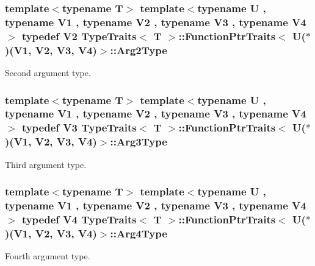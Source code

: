 \subsubsection[{\texorpdfstring{Arg2\+Type}{Arg2Type}}]{\setlength{\rightskip}{0pt plus 5cm}template$<$typename T$>$ template$<$typename U , typename V1 , typename V2 , typename V3 , typename V4 $>$ typedef V2 {\bf Type\+Traits}$<$ T $>$\+::{\bf Function\+Ptr\+Traits}$<$ U($\ast$)(V1, V2, V3, V4)$>$\+::{\bf Arg2\+Type}}\hypertarget{structTypeTraits_1_1FunctionPtrTraits_3_01U_07_5_08_07V1_00_01V2_00_01V3_00_01V4_08_4_a27f72dbf8afca02467b67af4f3ca1adc}{}\label{structTypeTraits_1_1FunctionPtrTraits_3_01U_07_5_08_07V1_00_01V2_00_01V3_00_01V4_08_4_a27f72dbf8afca02467b67af4f3ca1adc}
Second argument type. 
\subsubsection[{\texorpdfstring{Arg3\+Type}{Arg3Type}}]{\setlength{\rightskip}{0pt plus 5cm}template$<$typename T$>$ template$<$typename U , typename V1 , typename V2 , typename V3 , typename V4 $>$ typedef V3 {\bf Type\+Traits}$<$ T $>$\+::{\bf Function\+Ptr\+Traits}$<$ U($\ast$)(V1, V2, V3, V4)$>$\+::{\bf Arg3\+Type}}\hypertarget{structTypeTraits_1_1FunctionPtrTraits_3_01U_07_5_08_07V1_00_01V2_00_01V3_00_01V4_08_4_a317f0d2787af766d28a82c50047f2204}{}\label{structTypeTraits_1_1FunctionPtrTraits_3_01U_07_5_08_07V1_00_01V2_00_01V3_00_01V4_08_4_a317f0d2787af766d28a82c50047f2204}
Third argument type. 
\subsubsection[{\texorpdfstring{Arg4\+Type}{Arg4Type}}]{\setlength{\rightskip}{0pt plus 5cm}template$<$typename T$>$ template$<$typename U , typename V1 , typename V2 , typename V3 , typename V4 $>$ typedef V4 {\bf Type\+Traits}$<$ T $>$\+::{\bf Function\+Ptr\+Traits}$<$ U($\ast$)(V1, V2, V3, V4)$>$\+::{\bf Arg4\+Type}}\hypertarget{structTypeTraits_1_1FunctionPtrTraits_3_01U_07_5_08_07V1_00_01V2_00_01V3_00_01V4_08_4_ae578a3f14e76858eaf64155fb2f86de2}{}\label{structTypeTraits_1_1FunctionPtrTraits_3_01U_07_5_08_07V1_00_01V2_00_01V3_00_01V4_08_4_ae578a3f14e76858eaf64155fb2f86de2}
Fourth argument type. 
